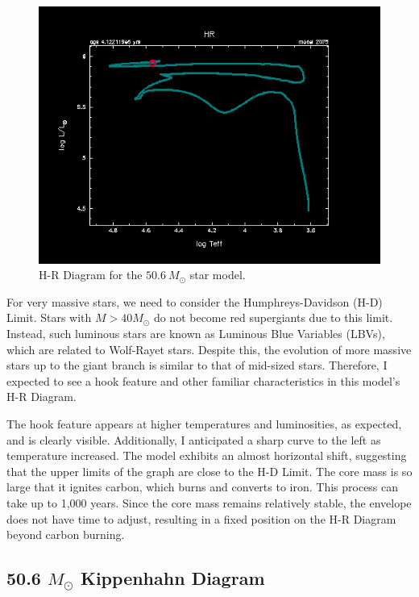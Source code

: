 \documentclass[fleqn,usenatbib]{mnras}
\begin{document}
\begin{figure}
    \centering
    \includegraphics[width=\columnwidth]{50.6 HR.png}
    \caption{H-R Diagram for the \(50.6\ M_\odot\) star model.}
    \label{fig:50.6_Msol_hr_figure}
\end{figure}


\par For very massive stars, we need to consider the Humphreys-Davidson (H-D) Limit. Stars with \(M > 40 M_\odot\) do not become red supergiants due to this limit. Instead, such luminous stars are known as Luminous Blue Variables (LBVs), which are related to Wolf-Rayet stars. Despite this, the evolution of more massive stars up to the giant branch is similar to that of mid-sized stars. Therefore, I expected to see a hook feature and other familiar characteristics in this model's H-R Diagram.

\par The hook feature appears at higher temperatures and luminosities, as expected, and is clearly visible. Additionally, I anticipated a sharp curve to the left as temperature increased. The model exhibits an almost horizontal shift, suggesting that the upper limits of the graph are close to the H-D Limit. The core mass is so large that it ignites carbon, which burns and converts to iron. This process can take up to 1,000 years. Since the core mass remains relatively stable, the envelope does not have time to adjust, resulting in a fixed position on the H-R Diagram beyond carbon burning.

\subsection{50.6 \(M_\odot\) Kippenhahn Diagram}
\end{document}
